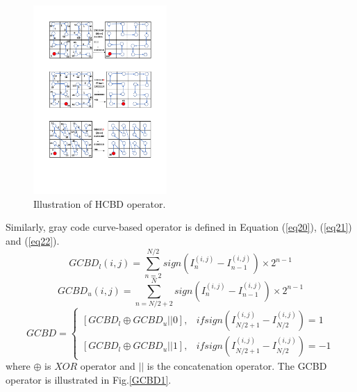 \begin{figure}[!ht]
	\centering
	\includegraphics[width=2.0in]{images/hcbd.pdf}
	\caption{Illustration of HCBD operator.}
	\label{HCBD1}
	\vspace{-4mm}
\end{figure}

\par

Similarly, gray code curve-based operator is defined in Equation (\ref{eq20}),
(\ref{eq21}) and (\ref{eq22}).
\begin{equation}\label{eq20}
	GCBD_{l}(i,j)=\sum_{n=2}^{N/2}sign(I_{n}^{(i,j)}-I_{n-1}^{(i,j)})\times 2^{n-1}
\end{equation}
\begin{equation}\label{eq21}
	GCBD_{u}(i,j)=\sum_{n=N/2+2}^{N}sign(I_{n}^{(i,j)}-I_{n-1}^{(i,j)})\times 2^{n-1}
\end{equation}
\begin{equation}\label{eq22}
	GCBD=
	\left\{\begin{matrix}
		[GCBD_{l} \oplus  GCBD_{u} || 0] , & if sign(I_{N/2+1}^{(i,j)}-I_{N/2}^{(i,j)})=1   \\
		[GCBD_{l} \oplus  GCBD_{u} || 1],  & if  sign(I_{N/2+1}^{(i,j)}-I_{N/2}^{(i,j)})=-1
	\end{matrix}\right.
\end{equation}
where $\oplus$ is $XOR$ operator and $||$ is the concatenation operator. The
GCBD operator is illustrated in Fig.\ref{GCBD1}.

